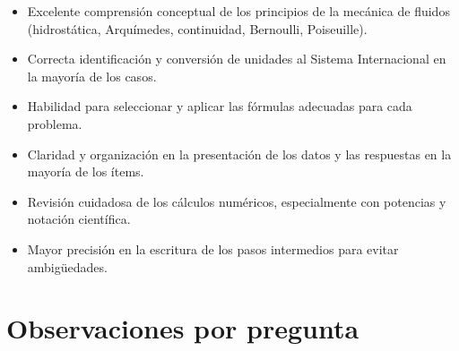 \documentclass[11pt,a4paper]{article}
\begin{document}
\vspace{4pt}
\begin{minipage}[t]{0.48\linewidth}
  \begin{tcolorbox}[cajaFortaleza, title={Fortalezas}]
\begin{itemize}[leftmargin=1.5em, itemsep=2pt]
  \item Excelente comprensión conceptual de los principios de la mecánica de fluidos (hidrostática, Arquímedes, continuidad, Bernoulli, Poiseuille).
  \item Correcta identificación y conversión de unidades al Sistema Internacional en la mayoría de los casos.
  \item Habilidad para seleccionar y aplicar las fórmulas adecuadas para cada problema.
  \item Claridad y organización en la presentación de los datos y las respuestas en la mayoría de los ítems.
\end{itemize}
  \end{tcolorbox}
\end{minipage}
\hfill
\begin{minipage}[t]{0.48\linewidth}
  \begin{tcolorbox}[cajaMejora, title={Areas de mejora}]
\begin{itemize}[leftmargin=1.5em, itemsep=2pt]
  \item Revisión cuidadosa de los cálculos numéricos, especialmente con potencias y notación científica.
  \item Mayor precisión en la escritura de los pasos intermedios para evitar ambigüedades.
\end{itemize}
  \end{tcolorbox}
\end{minipage}

\section*{Observaciones por pregunta}
\end{document}
